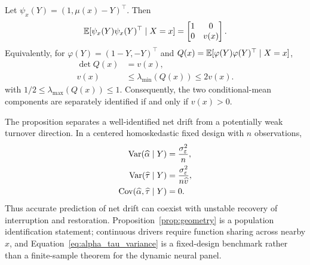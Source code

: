 \begin{proposition}
\label{prop:geometry}
Let $\psi_x(Y)=(1,\mu(x)-Y)^\top$. Then
\begin{equation}
\mathbb{E}[\psi_x(Y)\psi_x(Y)^\top\mid X=x]
=\begin{bmatrix}1&0\\0&v(x)\end{bmatrix}.
\label{eq:orthogonal_information}
\end{equation}
Equivalently, for $\varphi(Y)=(1-Y,-Y)^\top$ and $Q(x)=\mathbb{E}[\varphi(Y)\varphi(Y)^\top\mid X=x]$,
\begin{align}
\det Q(x)&=v(x),\nonumber\\
v(x)&\le\lambda_{\min}(Q(x))\le2v(x).
\label{eq:eigen_bounds}
\end{align}
with $1/2\le\lambda_{\max}(Q(x))\le1$. Consequently, the two conditional-mean components are separately identified if and only if $v(x)>0$.
\end{proposition}

The proposition separates a well-identified net drift from a potentially weak turnover direction. In a centered homoskedastic fixed design with $n$ observations,
\begin{align}
\operatorname{Var}(\widehat\alpha\mid Y)&=\frac{\sigma_\varepsilon^2}{n},\nonumber\\
\operatorname{Var}(\widehat\tau\mid Y)&=\frac{\sigma_\varepsilon^2}{n\widehat v},\nonumber\\
\operatorname{Cov}(\widehat\alpha,\widehat\tau\mid Y)&=0.
\label{eq:alpha_tau_variance}
\end{align}
Thus accurate prediction of net drift can coexist with unstable recovery of interruption and restoration. Proposition~\ref{prop:geometry} is a population identification statement; continuous drivers require function sharing across nearby $x$, and Equation~\eqref{eq:alpha_tau_variance} is a fixed-design benchmark rather than a finite-sample theorem for the dynamic neural panel.
